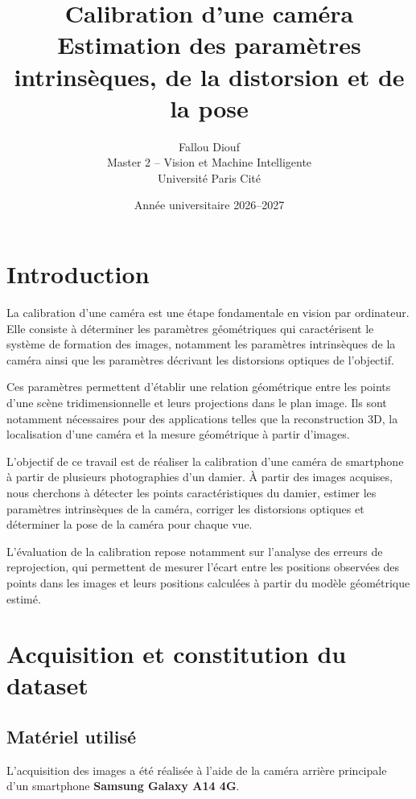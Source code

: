 \documentclass[12pt,a4paper]{report}
\title{
    \textbf{Calibration d'une caméra}\\[0.4cm]
    \large Estimation des paramètres intrinsèques,
    de la distorsion et de la pose
}
\author{
    Fallou Diouf\\
    Master 2 -- Vision et Machine Intelligente\\
    Université Paris Cité
}
\date{Année universitaire 2026--2027}
\begin{document}
\maketitle

\tableofcontents
\clearpage

\chapter{Introduction}

La calibration d'une caméra est une étape fondamentale
en vision par ordinateur. Elle consiste à déterminer
les paramètres géométriques qui caractérisent le
système de formation des images, notamment les
paramètres intrinsèques de la caméra ainsi que les
paramètres décrivant les distorsions optiques de
l'objectif.

Ces paramètres permettent d'établir une relation
géométrique entre les points d'une scène tridimensionnelle
et leurs projections dans le plan image. Ils sont
notamment nécessaires pour des applications telles que
la reconstruction 3D, la localisation d'une caméra
et la mesure géométrique à partir d'images.

L'objectif de ce travail est de réaliser la calibration
d'une caméra de smartphone à partir de plusieurs
photographies d'un damier. À partir des images acquises,
nous cherchons à détecter les points caractéristiques
du damier, estimer les paramètres intrinsèques de la
caméra, corriger les distorsions optiques et déterminer
la pose de la caméra pour chaque vue.

L'évaluation de la calibration repose notamment sur
l'analyse des erreurs de reprojection, qui permettent
de mesurer l'écart entre les positions observées des
points dans les images et leurs positions calculées
à partir du modèle géométrique estimé.

\chapter{Acquisition et constitution du dataset}

\section{Matériel utilisé}

L'acquisition des images a été réalisée à l'aide de
la caméra arrière principale d'un smartphone
\textbf{Samsung Galaxy A14 4G}.
\end{document}
